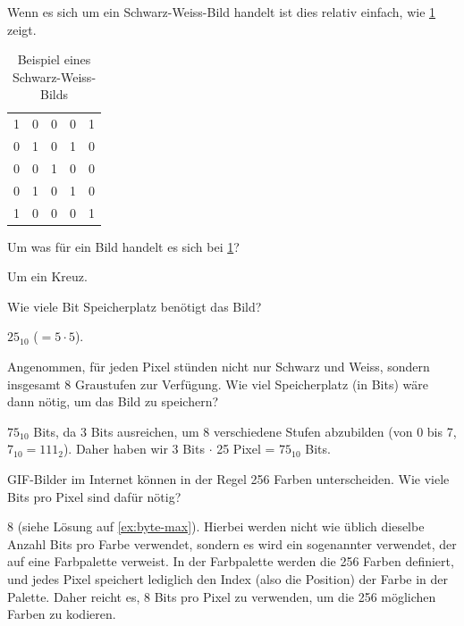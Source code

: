 Wenn es sich um ein Schwarz-Weiss-Bild handelt ist dies relativ einfach, wie \cref{table:bw-img} zeigt.

\begin{table}[H]
	\centering
	\begin{tabular}{lllll}
		1 & 0 & 0 & 0 & 1 \\
		0 & 1 & 0 & 1 & 0 \\
		0 & 0 & 1 & 0 & 0 \\
		0 & 1 & 0 & 1 & 0 \\
		1 & 0 & 0 & 0 & 1
	\end{tabular}
	\caption{Beispiel eines Schwarz-Weiss-Bilds}
	\label{table:bw-img}
\end{table}

\begin{myexercise}
	Um was für ein Bild handelt es sich bei \cref{table:bw-img}?
	\begin{myanswer}
		Um ein Kreuz.
	\end{myanswer}
\end{myexercise}

\begin{myexercise}
	Wie viele Bit Speicherplatz benötigt das Bild?
	\begin{myanswer}
		$25_{10}$ ($= 5\cdot 5$).
	\end{myanswer}
\end{myexercise}

\begin{myexercise}
	Angenommen, für jeden Pixel stünden nicht nur Schwarz und Weiss, sondern insgesamt 8 Graustufen zur Verfügung. Wie viel Speicherplatz (in Bits) wäre dann nötig, um das Bild zu speichern?
	\begin{myanswer}
		$75_{10}$ Bits, da 3 Bits ausreichen, um 8 verschiedene Stufen abzubilden (von 0 bis 7, $7_{10}=111_2$). Daher haben wir 3 Bits $\cdot$ 25 Pixel = $75_{10}$ Bits.
	\end{myanswer}
\end{myexercise}

\begin{myexercise}
	\gls{GIF}-Bilder im Internet können in der Regel 256 Farben unterscheiden. Wie viele Bits pro Pixel sind dafür nötig?
	\begin{myanswer}
		8 (siehe Lösung auf \cref{ex:byte-max}). Hierbei werden nicht wie üblich dieselbe Anzahl Bits pro Farbe verwendet, sondern es wird ein sogenannter  verwendet, der auf eine Farbpalette verweist. In der Farbpalette werden die 256 Farben definiert, und jedes Pixel speichert lediglich den Index (also die Position) der Farbe in der Palette. Daher reicht es, 8 Bits pro Pixel zu verwenden, um die 256 möglichen Farben zu kodieren.
	\end{myanswer}
\end{myexercise}

